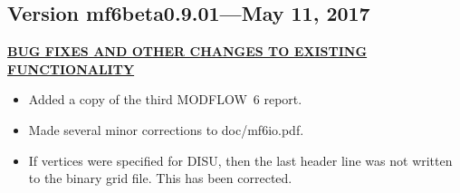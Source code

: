 	\subsection{Version mf6beta0.9.01---May 11, 2017}
	\textbf{\underline{BUG FIXES AND OTHER CHANGES TO EXISTING FUNCTIONALITY}} \\
	\begin{itemize}
		\item Added a copy of the third MODFLOW~6 report. 
		\item Made several minor corrections to doc/mf6io.pdf.  
		\item If vertices were specified for DISU, then the last header line was not written to the binary grid file.  This has been corrected.
	\end{itemize}
